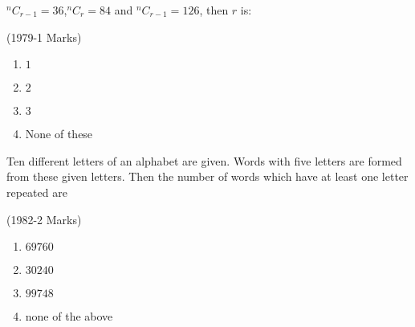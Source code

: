 \iffalse
 \title{ASSIGNMENT-1}
 \author{EE24BTECH11008- ASLIN GARVASIS}
 \section{mcq-single}
\fi

\item  $^nC_{r-1}=36$,$^nC_r=84$ and $^nC_{r-1}=126$, then $r$ is:

\hfill {(1979-1 Marks)}\\
\begin{enumerate}
 \item $1$
 \item $2$
 \item $3$
\item  None of these
\end{enumerate}
\item Ten different letters of an alphabet are given. Words with
 five letters are formed from these given letters. Then the
 number of words which have at least one letter repeated are
 
\hfill {(1982-2 Marks)}\\
\begin{enumerate}
 \item $69760$
 \item $30240$
 \item $99748$
 \item none of the above
\end{enumerate}
